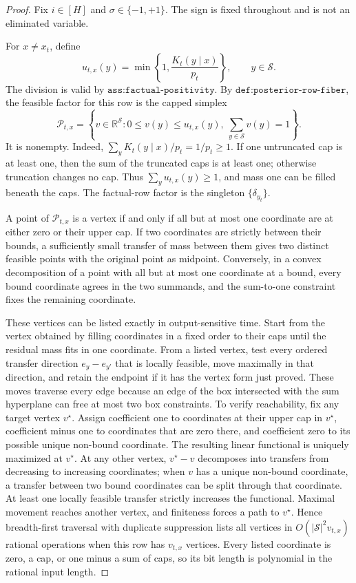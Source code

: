 \documentclass{article}
\begin{document}
\begin{proof}
Fix \(i\in[H]\) and \(\sigma\in\{-1,+1\}\).  The sign is fixed throughout and is not an eliminated variable.

For \(x\ne x_t\), define
\[
 u_{t,x}(y)=\min\!\left\{1,\frac{K_t(y\mid x)}{p_t}\right\},
 \qquad y\in\mathcal S.
 \tag{1}
\]
The division is valid by \(\texttt{ass:factual-positivity}\).  By \(\texttt{def:posterior-row-fiber}\), the feasible factor for this row is the capped simplex
\[
 \mathcal P_{t,x}=
 \left\{v\in\mathbb R^{\mathcal S}:0\le v(y)\le u_{t,x}(y),\ 
              \sum_{y\in\mathcal S}v(y)=1\right\}.
 \tag{2}
\]
It is nonempty.  Indeed, \(\sum_yK_t(y\mid x)/p_t=1/p_t\ge1\).  If one untruncated cap is at least one, then the sum of the truncated caps is at least one; otherwise truncation changes no cap.  Thus \(\sum_yu_{t,x}(y)\ge1\), and mass one can be filled beneath the caps.  The factual-row factor is the singleton \(\{\delta_{y_t}\}\).

A point of \(\mathcal P_{t,x}\) is a vertex if and only if all but at most one coordinate are at either zero or their upper cap.  If two coordinates are strictly between their bounds, a sufficiently small transfer of mass between them gives two distinct feasible points with the original point as midpoint.  Conversely, in a convex decomposition of a point with all but at most one coordinate at a bound, every bound coordinate agrees in the two summands, and the sum-to-one constraint fixes the remaining coordinate.

These vertices can be listed exactly in output-sensitive time.  Start from the vertex obtained by filling coordinates in a fixed order to their caps until the residual mass fits in one coordinate.  From a listed vertex, test every ordered transfer direction \(e_y-e_{y'}\) that is locally feasible, move maximally in that direction, and retain the endpoint if it has the vertex form just proved.  These moves traverse every edge because an edge of the box intersected with the sum hyperplane can free at most two box constraints.  To verify reachability, fix any target vertex \(v^\star\).  Assign coefficient one to coordinates at their upper cap in \(v^\star\), coefficient minus one to coordinates that are zero there, and coefficient zero to its possible unique non-bound coordinate.  The resulting linear functional is uniquely maximized at \(v^\star\).  At any other vertex, \(v^\star-v\) decomposes into transfers from decreasing to increasing coordinates; when \(v\) has a unique non-bound coordinate, a transfer between two bound coordinates can be split through that coordinate.  At least one locally feasible transfer strictly increases the functional.  Maximal movement reaches another vertex, and finiteness forces a path to \(v^\star\).  Hence breadth-first traversal with duplicate suppression lists all vertices in \(O(|\mathcal S|^2v_{t,x})\) rational operations when this row has \(v_{t,x}\) vertices.  Every listed coordinate is zero, a cap, or one minus a sum of caps, so its bit length is polynomial in the rational input length.


\end{proof}
\end{document}
